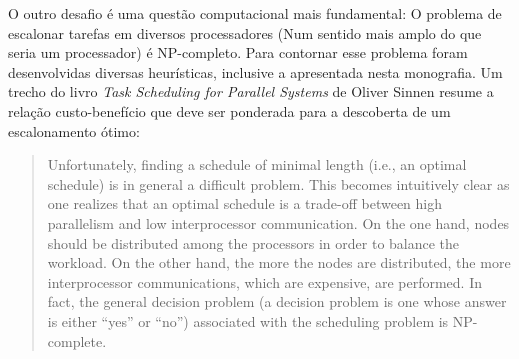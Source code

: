 O outro desafio é uma questão computacional mais fundamental: O problema de 
escalonar tarefas em diversos processadores (Num sentido mais amplo do que seria
um processador) é NP-completo. \cite{sinnen:task_scheduling_parallel_systems}
Para contornar esse problema foram desenvolvidas diversas heurísticas, inclusive
a apresentada nesta monografia. Um trecho do livro
\emph{Task Scheduling for Parallel Systems} de Oliver Sinnen resume a relação
custo-benefício que deve ser ponderada para a descoberta de um escalonamento
ótimo:

\begin{quote}
Unfortunately, finding a schedule of minimal length (i.e., an optimal schedule)
is in general a difficult problem. This becomes intuitively clear as one realizes that
an optimal schedule is a trade-off between high parallelism and low interprocessor
communication. On the one hand, nodes should be distributed among the processors
in order to balance the workload. On the other hand, the more the nodes are distributed,
the more interprocessor communications, which are expensive, are performed. In fact,
the general decision problem (a decision problem is one whose answer is either ``yes''
or ``no'') associated with the scheduling problem is NP-complete. 
\cite{sinnen:task_scheduling_parallel_systems}
\end{quote}



